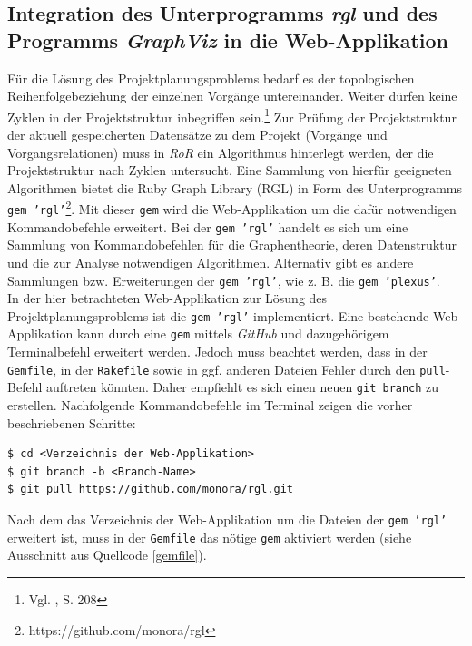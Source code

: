 \documentclass[a4paper,12pt,parskip,bibtotoc,liststotoc]{article}
\begin{document}
\subsection{Integration des Unterprogramms \textit{rgl} und des Programms \textit{GraphViz} in die Web-Applikation}\label{rgl-kapitel}
Für die Lösung des Projektplanungsproblems bedarf es der topologischen Reihenfolgebeziehung der einzelnen Vorgänge untereinander. Weiter dürfen keine Zyklen in der Projektstruktur inbegriffen sein.\footnote{Vgl. \cite{Helber}, S. 208} Zur Prüfung der Projektstruktur der aktuell gespeicherten Datensätze zu dem Projekt (Vorgänge und Vorgangsrelationen) muss in \textit{RoR} ein Algorithmus hinterlegt werden, der die Projektstruktur nach Zyklen untersucht. Eine Sammlung von hierfür geeigneten Algorithmen bietet die Ruby Graph Library (RGL) in Form des Unterprogramms \texttt{gem 'rgl'}\footnote{https://github.com/monora/rgl}. Mit dieser \texttt{gem} wird die Web-Applikation um die dafür notwendigen Kommandobefehle erweitert. Bei der \texttt{gem 'rgl'} handelt es sich um eine Sammlung von Kommandobefehlen für die Graphentheorie, deren Datenstruktur und die zur Analyse notwendigen Algorithmen. Alternativ gibt es andere Sammlungen bzw. Erweiterungen der \texttt{gem 'rgl'}, wie z. B. die \texttt{gem 'plexus'}.\\

In der hier betrachteten Web-Applikation zur Lösung des Projektplanungsproblems ist die \texttt{gem 'rgl'} implementiert. Eine bestehende Web-Applikation kann durch eine \texttt{gem} mittels \textit{GitHub} und dazugehörigem Terminalbefehl erweitert werden. Jedoch muss beachtet werden, dass in der \texttt{Gemfile}, in der \texttt{Rakefile} sowie in ggf. anderen Dateien Fehler durch den \texttt{pull}-Befehl auftreten könnten. Daher empfiehlt es sich einen neuen \texttt{git branch} zu erstellen. Nachfolgende Kommandobefehle im Terminal zeigen die vorher beschriebenen Schritte:  
\begin{lstlisting}[style=Befehl]
$ cd <Verzeichnis der Web-Applikation>
$ git branch -b <Branch-Name>
$ git pull https://github.com/monora/rgl.git
\end{lstlisting}

Nach dem das Verzeichnis der Web-Applikation um die Dateien der \texttt{gem 'rgl'} erweitert ist, muss in der \texttt{Gemfile} das nötige \texttt{gem} aktiviert werden (siehe Ausschnitt aus Quellcode \ref{gemfile}).


\end{document}
